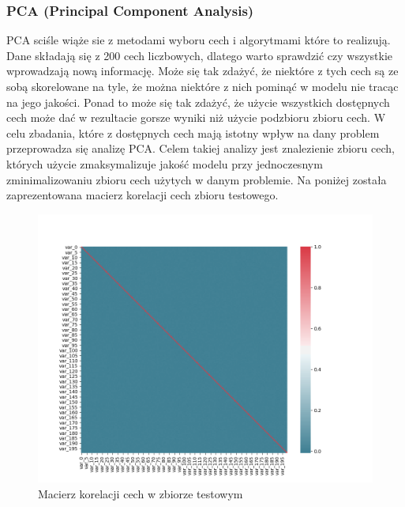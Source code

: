 ﻿\documentclass[12pt]{article}
\begin{document}
\subsubsection{PCA (Principal Component Analysis)}
PCA sciśle wiąże sie z metodami wyboru cech i algorytmami które to realizują.
Dane składają się z 200 cech liczbowych, dlatego warto sprawdzić czy wszystkie wprowadzają nową informację. Może się tak zdażyć, że niektóre z tych cech są ze sobą skorelowane na tyle, że można niektóre z nich pominąć w modelu nie tracąc na jego jakości. Ponad to może się tak zdażyć, że użycie wszystkich dostępnych cech może dać w rezultacie gorsze wyniki niż użycie podzbioru zbioru cech. W celu zbadania, które z dostępnych cech mają istotny wpływ na dany problem przeprowadza się analizę PCA. Celem takiej analizy jest znalezienie zbioru cech, których użycie zmaksymalizuje jakość modelu przy jednoczesnym zminimalizowaniu zbioru cech użytych w danym problemie.
\newline
Na poniżej została zaprezentowana macierz korelacji cech zbioru testowego.
\begin{figure}[H]
\centering 
\includegraphics[width = 472pt]{feature_correlation_matrix}
\caption{Macierz korelacji cech w zbiorze testowym}
\label{feature_correlation_matrix}
\end{figure}
\end{document}
